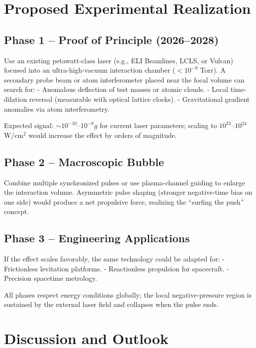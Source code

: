 \documentclass[11pt,a4paper]{article}
\begin{document}
\section{Proposed Experimental Realization}

\subsection{Phase 1 -- Proof of Principle (2026--2028)}

Use an existing petawatt-class laser (e.g., ELI Beamlines, LCLS, or Vulcan) focused into an ultra-high-vacuum interaction chamber ($<10^{-9}$ Torr). A secondary probe beam or atom interferometer placed near the focal volume can search for:
- Anomalous deflection of test masses or atomic clouds.
- Local time-dilation reversal (measurable with optical lattice clocks).
- Gravitational gradient anomalies via atom interferometry.

Expected signal: $\sim 10^{-10}$--$10^{-8} g$ for current laser parameters; scaling to $10^{23}$--$10^{24}$ W/cm$^2$ would increase the effect by orders of magnitude.

\subsection{Phase 2 -- Macroscopic Bubble}

Combine multiple synchronized pulses or use plasma-channel guiding to enlarge the interaction volume. Asymmetric pulse shaping (stronger negative-time bias on one side) would produce a net propulsive force, realizing the ``surfing the push'' concept.

\subsection{Phase 3 -- Engineering Applications}

If the effect scales favorably, the same technology could be adapted for:
- Frictionless levitation platforms.
- Reactionless propulsion for spacecraft.
- Precision spacetime metrology.

All phases respect energy conditions globally; the local negative-pressure region is sustained by the external laser field and collapses when the pulse ends.

\section{Discussion and Outlook}
\end{document}
